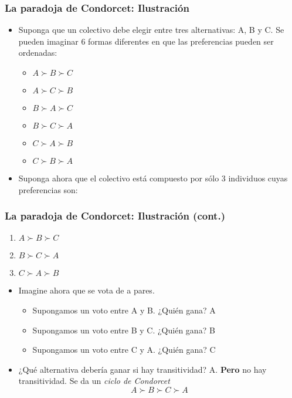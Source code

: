 \documentclass[14pt,aspectratio=169]{beamer}
\begin{document}
\begin{frame}\frametitle{La paradoja de Condorcet: Ilustración}
\begin{itemize}
\item Suponga que un colectivo debe elegir entre tres alternativas: A, B y
  C. Se pueden imaginar 6 formas diferentes en que las
  preferencias pueden ser ordenadas:
\begin{itemize}
\item $A \succ B \succ C$
\item $A \succ C \succ B$
\item $B \succ A \succ C$
\item $B \succ C \succ A$
\item $C \succ A \succ B$
\item $C \succ B \succ A$
\end{itemize}
\item Suponga ahora que el colectivo está compuesto por sólo 3
  individuos cuyas preferencias son:
\end{itemize}
\end{frame}


\begin{frame}\frametitle{La paradoja de Condorcet: Ilustración (cont.)}
\begin{enumerate}\itemsep 5pt
\item $A \succ B \succ C$
\item $B \succ C \succ A$
\item $C \succ A \succ B$
\end{enumerate}
\begin{itemize}
\item Imagine ahora que se vota de a pares.
\begin{itemize}\itemsep 5pt
\item Supongamos un voto entre A y B. ¿Quién gana? A
\item Supongamos un voto entre B y C. ¿Quién gana? B
\item Supongamos un voto entre C y A. ¿Quién gana? C
\end{itemize}
\item ¿Qué alternativa debería ganar si hay transitividad?
  A. \textbf{Pero} no hay transitividad. Se da un \textit{ciclo de
    Condorcet}
\begin{equation*}
A \succ B \succ C \succ A
\end{equation*}
\end{itemize}
\end{frame}
\end{document}
